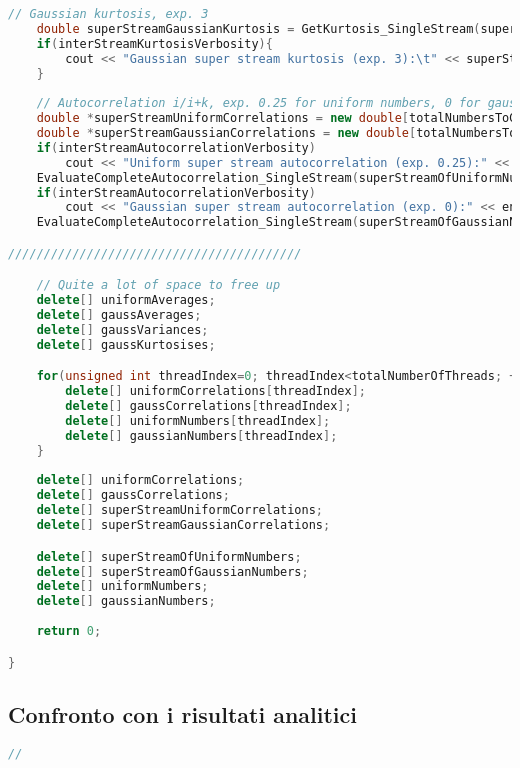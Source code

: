 \begin{lstlisting}[language=C++, caption={\texttt{libraries/CoreLibraries/RandomGenerator/CorrelationTest.cu}}]
	// Gaussian kurtosis, exp. 3
	double superStreamGaussianKurtosis = GetKurtosis_SingleStream(superStreamOfGaussianNumbers, superStreamGaussAverage, superStreamGaussianVariance, totalNumbersToGenerate);
	if(interStreamKurtosisVerbosity){
		cout << "Gaussian super stream kurtosis (exp. 3):\t" << superStreamGaussianKurtosis << endl;
	}
	
	// Autocorrelation i/i+k, exp. 0.25 for uniform numbers, 0 for gaussian numbers
	double *superStreamUniformCorrelations = new double[totalNumbersToGenerate-2];
	double *superStreamGaussianCorrelations = new double[totalNumbersToGenerate-2];
	if(interStreamAutocorrelationVerbosity)
		cout << "Uniform super stream autocorrelation (exp. 0.25):" << endl;
	EvaluateCompleteAutocorrelation_SingleStream(superStreamOfUniformNumbers, superStreamUniformCorrelations, totalNumbersToGenerate, interStreamAutocorrelationVerbosity);
	if(interStreamAutocorrelationVerbosity)
		cout << "Gaussian super stream autocorrelation (exp. 0):" << endl;
	EvaluateCompleteAutocorrelation_SingleStream(superStreamOfGaussianNumbers, superStreamGaussianCorrelations, totalNumbersToGenerate, interStreamAutocorrelationVerbosity);

/////////////////////////////////////////

	// Quite a lot of space to free up
	delete[] uniformAverages;
	delete[] gaussAverages;
	delete[] gaussVariances;
	delete[] gaussKurtosises;

	for(unsigned int threadIndex=0; threadIndex<totalNumberOfThreads; ++threadIndex){
		delete[] uniformCorrelations[threadIndex];
		delete[] gaussCorrelations[threadIndex];
		delete[] uniformNumbers[threadIndex];
		delete[] gaussianNumbers[threadIndex];
	}
	
	delete[] uniformCorrelations;
	delete[] gaussCorrelations;
	delete[] superStreamUniformCorrelations;
	delete[] superStreamGaussianCorrelations;

	delete[] superStreamOfUniformNumbers;
	delete[] superStreamOfGaussianNumbers;
	delete[] uniformNumbers;
	delete[] gaussianNumbers;
	
	return 0;

}
\end{lstlisting}

\subsection{Confronto con i risultati analitici}
\lipsum[1-3]

\begin{lstlisting}[language=C++, caption={\texttt{libraries/CoreLibraries/Path/BlackScholesUnitTest.cu}}]
//
\end{lstlisting}

